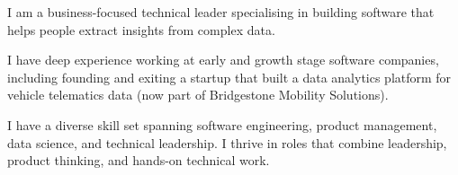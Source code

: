 

\begin{cvparagraph}

I am a business-focused technical leader specialising in building software that helps people extract insights from complex data.

I have deep experience working at early and growth stage software companies, including founding and exiting a startup that built a data analytics platform for vehicle telematics data (now part of Bridgestone Mobility Solutions).

I have a diverse skill set spanning software engineering, product management, data science, and technical leadership. I thrive in roles that combine leadership, product thinking, and hands-on technical work.

\end{cvparagraph}
